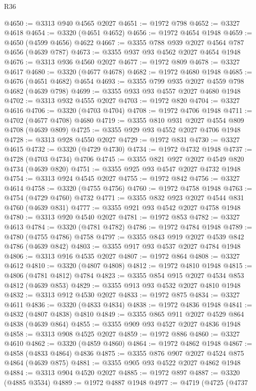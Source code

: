 \begin{lexlean}{R36}
\begin{coremodule}
@4650 := @3313 @940 @4565 @2027
@4651 := @1972 @798
@4652 := @3327 @4618
@4654 := @3320 (@4651 @4652)
@4656 := @1972 @4654 @1948
@4659 := @4650 (@4599 @4656) @4622
@4667 := @3355 @788 @939 @2027 @4564 @787 @4656 (@4639 @787)
@4673 := @3355 @937 @93 @4562 @2027 @4654 @1948
@4676 := @3313 @936 @4560 @2027
@4677 := @1972 @809
@4678 := @3327 @4617
@4680 := @3320 (@4677 @4678)
@4682 := @1972 @4680 @1948
@4685 := @4676 (@4651 @4682) @4654
@4693 := @3355 @799 @935 @2027 @4559 @798 @4682 (@4639 @798)
@4699 := @3355 @933 @93 @4557 @2027 @4680 @1948
@4702 := @3313 @932 @4555 @2027
@4703 := @1972 @820
@4704 := @3327 @4616
@4706 := @3320 (@4703 @4704)
@4708 := @1972 @4706 @1948
@4711 := @4702 (@4677 @4708) @4680
@4719 := @3355 @810 @931 @2027 @4554 @809 @4708 (@4639 @809)
@4725 := @3355 @929 @93 @4552 @2027 @4706 @1948
@4728 := @3313 @928 @4550 @2027
@4729 := @1972 @831
@4730 := @3327 @4615
@4732 := @3320 (@4729 @4730)
@4734 := @1972 @4732 @1948
@4737 := @4728 (@4703 @4734) @4706
@4745 := @3355 @821 @927 @2027 @4549 @820 @4734 (@4639 @820)
@4751 := @3355 @925 @93 @4547 @2027 @4732 @1948
@4754 := @3313 @924 @4545 @2027
@4755 := @1972 @842
@4756 := @3327 @4614
@4758 := @3320 (@4755 @4756)
@4760 := @1972 @4758 @1948
@4763 := @4754 (@4729 @4760) @4732
@4771 := @3355 @832 @923 @2027 @4544 @831 @4760 (@4639 @831)
@4777 := @3355 @921 @93 @4542 @2027 @4758 @1948
@4780 := @3313 @920 @4540 @2027
@4781 := @1972 @853
@4782 := @3327 @4613
@4784 := @3320 (@4781 @4782)
@4786 := @1972 @4784 @1948
@4789 := @4780 (@4755 @4786) @4758
@4797 := @3355 @843 @919 @2027 @4539 @842 @4786 (@4639 @842)
@4803 := @3355 @917 @93 @4537 @2027 @4784 @1948
@4806 := @3313 @916 @4535 @2027
@4807 := @1972 @864
@4808 := @3327 @4612
@4810 := @3320 (@4807 @4808)
@4812 := @1972 @4810 @1948
@4815 := @4806 (@4781 @4812) @4784
@4823 := @3355 @854 @915 @2027 @4534 @853 @4812 (@4639 @853)
@4829 := @3355 @913 @93 @4532 @2027 @4810 @1948
@4832 := @3313 @912 @4530 @2027
@4833 := @1972 @875
@4834 := @3327 @4611
@4836 := @3320 (@4833 @4834)
@4838 := @1972 @4836 @1948
@4841 := @4832 (@4807 @4838) @4810
@4849 := @3355 @865 @911 @2027 @4529 @864 @4838 (@4639 @864)
@4855 := @3355 @909 @93 @4527 @2027 @4836 @1948
@4858 := @3313 @908 @4525 @2027
@4859 := @1972 @886
@4860 := @3327 @4610
@4862 := @3320 (@4859 @4860)
@4864 := @1972 @4862 @1948
@4867 := @4858 (@4833 @4864) @4836
@4875 := @3355 @876 @907 @2027 @4524 @875 @4864 (@4639 @875)
@4881 := @3355 @905 @93 @4522 @2027 @4862 @1948
@4884 := @3313 @904 @4520 @2027
@4885 := @1972 @897
@4887 := @3320 (@4885 @3534)
@4889 := @1972 @4887 @1948
@4977 := @4719
    (@4725
      (@4737

\end{coremodule}
\end{lexlean}

